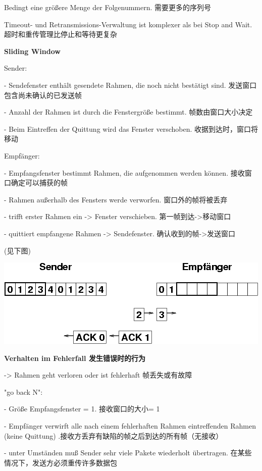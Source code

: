 \documentclass[fleqn]{article}
\begin{document}
Bedingt eine größere Menge der Folgenummern. 需要更多的序列号 

Timeout- und Retransmissions-Verwaltung ist komplexer als bei Stop and Wait. 超时和重传管理比停止和等待更复杂

\noindent\textbf{Sliding Window}

Sender:

- Sendefenster enthält gesendete Rahmen, die noch nicht bestätigt sind. 发送窗口包含尚未确认的已发送帧

- Anzahl der Rahmen ist durch die Fenstergröße bestimmt. 帧数由窗口大小决定 

- Beim Eintreffen der Quittung wird das Fenster verschoben. 收据到达时，窗口将移动 

Empfänger:

- Empfangsfenster bestimmt Rahmen, die aufgenommen werden können. 接收窗口确定可以捕获的帧 

- Rahmen außerhalb des Fensters werde verworfen. 窗口外的帧将被丢弃

- trifft erster Rahmen ein -> Fenster verschieben. 第一帧到达->移动窗口 

- quittiert empfangene Rahmen -> Sendefenster. 确认收到的帧->发送窗口

(见下图)

\begin{center}
    \includegraphics[scale=0.6]{bild28.png}
\end{center}

\noindent\textbf{Verhalten im Fehlerfall 发生错误时的行为}

-> Rahmen geht verloren oder ist fehlerhaft 帧丢失或有故障

"go back N": 

- Größe Empfangsfenster = 1. 接收窗口的大小= 1 

- Empfänger verwirft alle nach einem fehlerhaften Rahmen eintreffenden Rahmen (keine Quittung) 
.接收方丢弃有缺陷的帧之后到达的所有帧（无接收） 

- unter Umständen muß Sender sehr viele Pakete wiederholt übertragen. 在某些情况下，发送方必须重传许多数据包 
\end{document}
